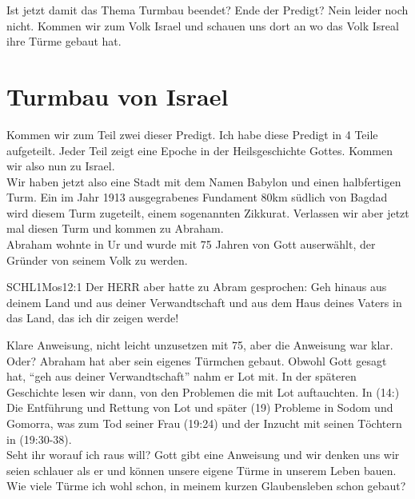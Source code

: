 \documentclass[14pt]{../../inc/mybib}
\begin{document}
    Ist jetzt damit das Thema Turmbau beendet? Ende der Predigt? Nein leider noch nicht. Kommen wir zum Volk Israel und schauen uns dort an wo das Volk Isreal ihre Türme gebaut hat.
    
    \section{Turmbau von Israel}
    Kommen wir zum Teil zwei dieser Predigt. Ich habe diese Predigt in 4 Teile aufgeteilt. Jeder Teil zeigt eine Epoche in der Heilsgeschichte Gottes. Kommen wir also nun zu Israel.
    \\
    
    Wir haben jetzt also eine Stadt mit dem Namen Babylon und einen halbfertigen Turm. Ein im Jahr 1913 ausgegrabenes Fundament 80km südlich von Bagdad wird diesem Turm zugeteilt, einem sogenannten Zikkurat. Verlassen wir aber jetzt mal diesen Turm und kommen zu Abraham.
    \\

    Abraham wohnte in Ur und wurde mit 75 Jahren von Gott auserwählt, der Gründer von seinem Volk zu werden. 
    \begin{bibelbox}{SCHL}{1Mos}{12:1}
        Der HERR aber hatte zu Abram gesprochen: Geh hinaus aus deinem Land und aus deiner Verwandtschaft und aus dem Haus deines Vaters in das Land, das ich dir zeigen werde!
    \end{bibelbox} 
    Klare Anweisung, nicht leicht unzusetzen mit 75, aber die Anweisung war klar. Oder? Abraham hat aber sein eigenes Türmchen gebaut. Obwohl Gott gesagt hat, \enquote{geh aus deiner Verwandtschaft} nahm er Lot mit. In der späteren Geschichte lesen wir dann, von den Problemen die mit Lot auftauchten. In (14:) Die Entführung und Rettung von Lot und später (19) Probleme in Sodom und Gomorra, was zum Tod seiner Frau (19:24) und der Inzucht mit seinen Töchtern in (19:30-38).
    \\
    
    Seht ihr worauf ich raus will? Gott gibt eine Anweisung und wir denken uns wir seien schlauer als er und können unsere eigene Türme in unserem Leben bauen. Wie viele Türme ich wohl schon, in meinem kurzen Glaubensleben schon gebaut?
    \\
\end{document}
